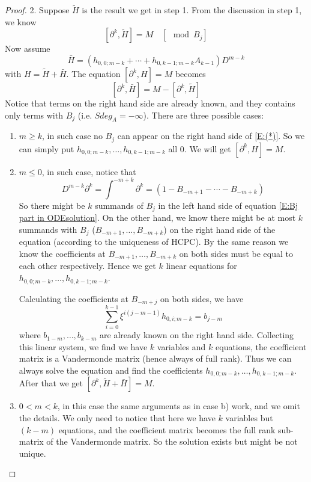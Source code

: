 \documentclass[11pt]{article}
\theoremstyle{definition}
\theoremstyle{plain}
\numberwithin{equation}{section}
\begin{document}
\begin{proof}
		2. Suppose $\tilde{H}$ is the result we get in step 1. From the discussion in step 1, we know 
		$$
		[\partial^k,\tilde{H}]=M \quad [\mod B_j]
		$$
		Now assume  $$
		\bar{H}=(h_{0,0;m-k}+\cdots+h_{0,k-1;m-k}A_{k-1})D^{m-k}
		$$
		with $H=\tilde{H}+\bar{H}$. The equation $[\partial^k,H]=M$ becomes
		\begin{equation}
			\label{E:Bj part in ODEsolution}
		[\partial^k,\bar{H}]=M-[\partial^k,\tilde{H}]
	    \end{equation}
		Notice that terms on the right hand side are already known, and they contains only terms with $B_j$ (i.e. $Sdeg_A=-\infty$). There are three possible cases:
		\begin{enumerate}
			\item $m\ge k$, in such case no $B_j$ can appear on the right hand side of \eqref{E:(*)}. So we can simply put $h_{0,0;m-k},\dots,h_{0,k-1;m-k}$ all 0. We will get $[\partial^k,H]=M$.
			\item $m\leq 0$, in such case, notice that 
			$$
		    D^{m-k}\partial^k=\int^{-m+k}\partial^k=(1-B_{-m+1}-\cdots-B_{-m+k})
			$$
			So there might be $k$ summands  of $B_j$  in the left hand side of equation \eqref{E:Bj part in ODEsolution}. On the other hand, we know there might be at most $k$ summands with $B_j$ ($B_{-m+1},\dots,B_{-m+k}$) on the right hand side of the equation (according to the uniqueness of HCPC). By the same reason  we know the coefficients at $B_{-m+1},\dots,B_{-m+k}$ on both sides must be equal to each other respectively. Hence we get $k$ linear equations for $h_{0,0;m-k},\dots,h_{0,k-1;m-k}$.
			
			Calculating the coefficients at $B_{-m+j}$ on both sides, we have 
			$$
			\sum_{i=0}^{k-1}\xi^{i(j-m-1)}h_{0,i;m-k}=b_{j-m}
			$$
			where $b_{1-m},\dots,b_{k-m}$ are already known on the right hand side. Collecting this linear system, we find we have $k$ variables and $k$  equations, the coefficient matrix is a Vandermonde matrix (hence always of full rank). Thus we can always solve the equation and find the coefficients $h_{0,0;m-k},\dots,h_{0,k-1;m-k}$. After that we get $[\partial^k,\tilde{H}+\bar{H}]=M$.
			\item $0<m<k$, in this case the same arguments as in case b) work, and 
			we omit the details. We only need to notice that here we have $k$ variables but $(k-m)$ equations, and the coefficient matrix becomes the full rank sub-matrix of the Vandermonde matrix. So the solution exists but might be not unique.  
		\end{enumerate}
	
\end{proof}
\end{document}
